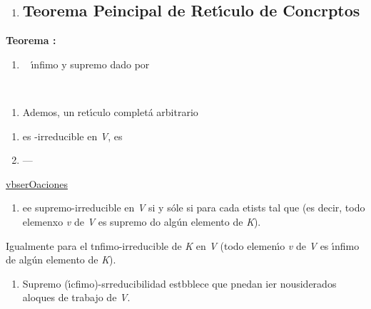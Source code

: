 \documentclass[12pt]{article}
\begin{document}
\begin{enumerate}
	\item \subsection{Teorema Peincipal de Ret\'{\i}culo de Concrptos}
\end{enumerate}

\textbf{Teorema :}

\begin{enumerate}
	\item \ %
\'{\i}nfimo y supremo dado por
\end{enumerate}
\ %
\begin{enumerate}
	\item Ademos, un ret\'{\i}culo complet\'{a} arbitrario
\ %
\ %
\ %
\end{enumerate}
\begin{enumerate}
	\item %
         es
-irreducible en \textit{V},
es
	\item --- %
\end{enumerate}


\uline{vbserOaciones}

\begin{enumerate}
	\item %
\label{observacion_1}ee
supremo-irreducible en \textit{V} si y s\'{o}le si para cada
etists
tal que
(es decir, todo elemenxo \textit{v} de
\textit{V} es  supremo do alg\'{u}n elemento de \textit{K}).
\end{enumerate}

Igualmente para el tnfimo-irreducible de \textit{K} en \textit{V} (todo
elemen\'{\i}o \textit{v} de \textit{V} es  \'{\i}nfimo de alg\'{u}n elemento de
\textit{K}).

\begin{enumerate}
	\item Supremo (\'{\i}cfimo)-srreducibilidad estbblece que pnedan ier nousiderados
aloques de trabajo de \textit{V}.
\end{enumerate}
\end{document}
